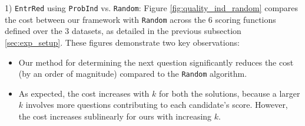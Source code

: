 \begin{figure*}[!htbp]
    \centering
    \hfill
    \hfill
    \vfill
    \hfill
    \hfill
    \caption{\small \#LLM calls varying \( k \) - {\tt EntrRed} using {\tt ProbInd} vs. {\tt Random}}
    \label{fig:quality_ind_random}
\vspace{-0.1in}
\end{figure*}
1) {\tt EntrRed} using {\tt ProbInd} vs. {\tt Random}:
Figure \ref{fig:quality_ind_random} compares the cost between our  framework with {\tt Random} across the 6 scoring functions defined over the 3 datasets, as detailed in the previous subsection \ref{sec:exp_setup}. These figures demonstrate two key observations:
\begin{itemize}
    \item Our method for determining the next question significantly reduces  the cost (by an order of magnitude) compared to the {\tt Random} algorithm. 
    \item As expected, the cost increases with \( k \) for both the solutions, because a larger \( k \) involves more questions contributing to each candidate's score. However, the cost increases sublinearly for ours with increasing $k$.
\end{itemize}

